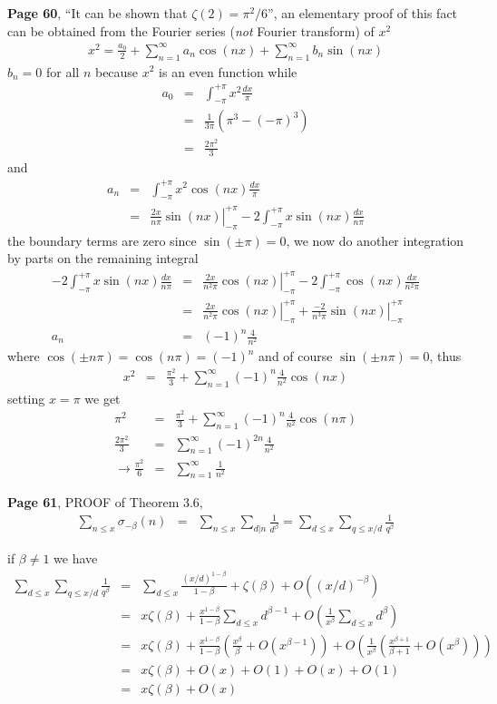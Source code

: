 \documentclass[aps,preprint,preprintnumbers,nofootinbib,showpacs,prd]{revtex4-1}
\newcommand{\nbea}{\begin{eqnarray*}}
\newcommand{\neea}{\end{eqnarray*}}
\begin{document}
{\bf Page 60}, ``It can be shown that $\zeta(2) = \pi^2/6$'', an elementary proof of this fact can be obtained from the Fourier series ({\it not} Fourier transform) of $x^2$
%
\nbea
x^2 = \frac{a_0}{2} + \sum_{n=1}^\infty a_n\cos(nx) + \sum_{n=1}^\infty b_n\sin(nx)
\neea
%
$b_n = 0$ for all $n$ because $x^2$ is an even function while
%
\nbea
a_0 & = & \int_{-\pi}^{+\pi} x^2 \frac{dx}{\pi} \\
& = & \frac{1}{3\pi} \left (\pi^3 - (-\pi)^3 \right ) \\
& = & \frac{2\pi^2}{3}
\neea
%
and
%
\nbea
a_n & = & \int_{-\pi}^{+\pi} x^2 \cos(nx) \frac{dx}{\pi} \\
& = & \left.\frac{2x}{n\pi}\sin(nx)\right|_{-\pi}^{+\pi} - 2\int_{-\pi}^{+\pi} x \sin(nx) \frac{dx}{n\pi}
\neea
%
the boundary terms are zero since $\sin(\pm\pi) = 0$, we now do another integration by parts on the remaining integral
%
\nbea
- 2\int_{-\pi}^{+\pi} x \sin(nx) \frac{dx}{n\pi} & = & \left.\frac{2x}{n^2\pi}\cos(nx)\right|_{-\pi}^{+\pi} - 2\int_{-\pi}^{+\pi}  \cos(nx) \frac{dx}{n^2\pi} \\
& = & \left.\frac{2x}{n^2\pi}\cos(nx)\right|_{-\pi}^{+\pi}  + \left.\frac{-2}{n^3\pi}\sin(nx)\right|_{-\pi}^{+\pi} \\
a_n & = & (-1)^n\frac{4}{n^2}
\neea
%
where $\cos(\pm n\pi) = \cos(n\pi) = (-1)^n$ and of course $\sin(\pm n\pi) = 0$, thus
%
\nbea
x^2 & = & \frac{\pi^2}{3} + \sum_{n=1}^\infty (-1)^n\frac{4}{n^2} \cos(nx)
\neea
%
setting $x=\pi$ we get
%
\nbea
\pi^2 & = & \frac{\pi^2}{3} + \sum_{n=1}^\infty (-1)^n\frac{4}{n^2} \cos(n\pi) \\
\frac{2\pi^2}{3} & = & \sum_{n=1}^\infty (-1)^{2n}\frac{4}{n^2} \\
\to \frac{\pi^2}{6} & = & \sum_{n=1}^\infty \frac{1}{n^2}
\neea
%

{\bf Page 61}, PROOF of Theorem 3.6,
%
\nbea
\sum_{n\le x} \sigma_{-\beta}(n) & = & \sum_{n\le x} \sum_{d|n}\frac{1}{d^\beta} = \sum_{d\le x} \sum_{q\le x/d}\frac{1}{q^\beta}
\neea
%

if $\beta \neq 1$ we have
%
\nbea
\sum_{d\le x} \sum_{q\le x/d}\frac{1}{q^\beta} & = & \sum_{d\le x} \frac{(x/d)^{1-\beta}}{1-\beta} + \zeta(\beta) + O\left ((x/d)^{-\beta}\right ) \\
& = & x\zeta(\beta) + \frac{x^{1-\beta}}{1-\beta} \sum_{d\le x} d^{\beta-1} + O\left (\frac{1}{x^\beta}\sum_{d\le x} d^{\beta}\right ) \\
& = & x\zeta(\beta) + \frac{x^{1-\beta}}{1-\beta} \left ( \frac{x^\beta}{\beta} + O(x^{\beta-1}) \right ) + O\left (\frac{1}{x^\beta}\left (\frac{x^{\beta+1}}{\beta+1} + O(x^{\beta}) \right )\right ) \\
& = & x\zeta(\beta) + O(x)  + O(1)  + O(x) + O(1) \\
& = & x\zeta(\beta) + O(x)
\neea
%
\end{document}
